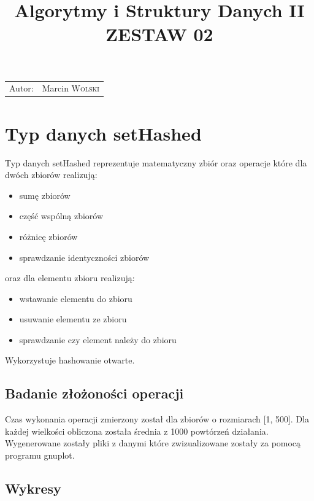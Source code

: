 \documentclass{article}
\title{Algorytmy i Struktury Danych II \\ ZESTAW 02} %
\author{} %
\date{} %
\begin{document}
\maketitle %

\begin{center}
\begin{tabular}{l r}
Autor: & Marcin \textsc{Wolski}
\end{tabular}
\end{center}

\section*{Typ danych setHashed}

Typ danych setHashed reprezentuje matematyczny zbiór oraz operacje które dla dwóch zbiorów realizują: 
\begin{itemize} 
    \item sumę zbiorów
    \item część wspólną zbiorów
    \item różnicę zbiorów
    \item sprawdzanie identyczności zbiorów
\end{itemize}
oraz dla elementu zbioru realizują: 
\begin{itemize}
    \item wstawanie elementu do zbioru
    \item usuwanie elementu ze zbioru
    \item sprawdzanie czy element należy do zbioru
\end{itemize}
Wykorzystuje hashowanie otwarte. 

\subsection*{Badanie złożoności operacji}
 Czas wykonania operacji zmierzony został dla zbiorów o rozmiarach [1, 500]. Dla każdej wielkości obliczona została średnia z 1000 powtórzeń działania. Wygenerowane zostały pliki z danymi które zwizualizowane zostały za pomocą programu gnuplot.
\subsection*{Wykresy}
\end{document}
